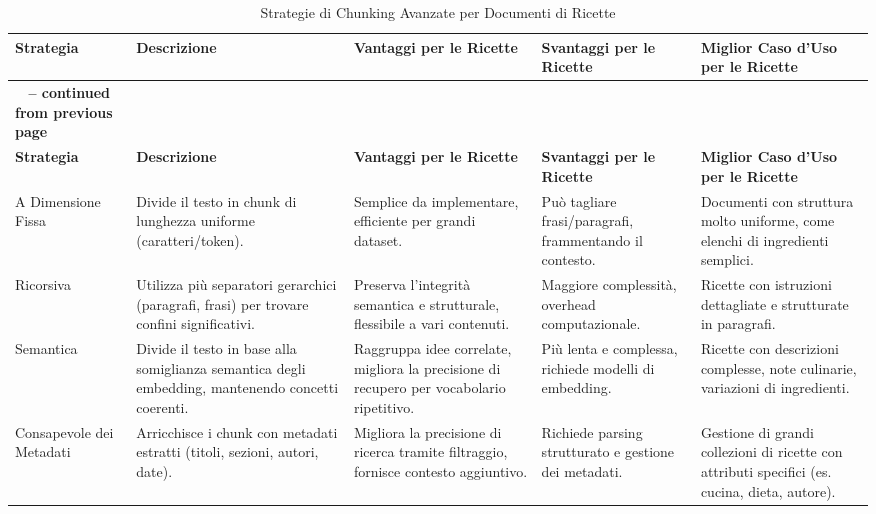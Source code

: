\documentclass[a4paper, 11pt]{article}
\begin{document}
\begin{longtable}{>{\raggedright\arraybackslash}p{2.5cm} >{\raggedright\arraybackslash}p{3.5cm} >{\raggedright\arraybackslash}p{3.5cm} >{\raggedright\arraybackslash}p{3cm} >{\raggedright\arraybackslash}p{3.5cm}}
\caption{Strategie di Chunking Avanzate per Documenti di Ricette}\\
\toprule
\textbf{Strategia} & \textbf{Descrizione} & \textbf{Vantaggi per le Ricette} & \textbf{Svantaggi per le Ricette} & \textbf{Miglior Caso d'Uso per le Ricette} \\
\midrule
\endfirsthead
\multicolumn{5}{c}%
{{\bfseries \tablename\ \thetable{} -- continued from previous page}} \\
\toprule
\textbf{Strategia} & \textbf{Descrizione} & \textbf{Vantaggi per le Ricette} & \textbf{Svantaggi per le Ricette} & \textbf{Miglior Caso d'Uso per le Ricette} \\
\midrule
\endhead
\bottomrule
\endfoot
A Dimensione Fissa \cite{chunking_strategies_ibm} & Divide il testo in chunk di lunghezza uniforme (caratteri/token). & Semplice da implementare, efficiente per grandi dataset. \cite{f22_chunking_strategies} & Può tagliare frasi/paragrafi, frammentando il contesto. \cite{semantic_chunking_ani} & Documenti con struttura molto uniforme, come elenchi di ingredienti semplici. \\
\addlinespace
Ricorsiva \cite{chunking_strategies_ibm} & Utilizza più separatori gerarchici (paragrafi, frasi) per trovare confini significativi. & Preserva l'integrità semantica e strutturale, flessibile a vari contenuti. \cite{f22_chunking_strategies} & Maggiore complessità, overhead computazionale. \cite{f22_chunking_strategies} & Ricette con istruzioni dettagliate e strutturate in paragrafi. \\
\addlinespace
Semantica \cite{semantic_chunking_multimodal} & Divide il testo in base alla somiglianza semantica degli embedding, mantenendo concetti coerenti. & Raggruppa idee correlate, migliora la precisione di recupero per vocabolario ripetitivo. \cite{semantic_chunking_multimodal} & Più lenta e complessa, richiede modelli di embedding. \cite{semantic_chunking_ani} & Ricette con descrizioni complesse, note culinarie, variazioni di ingredienti. \\
\addlinespace
Consapevole dei Metadati \cite{semantic_chunking_multimodal} & Arricchisce i chunk con metadati estratti (titoli, sezioni, autori, date). & Migliora la precisione di ricerca tramite filtraggio, fornisce contesto aggiuntivo. \cite{metadata_aware_chunking_asimsultan} & Richiede parsing strutturato e gestione dei metadati. \cite{metadata_aware_chunking_asimsultan} & Gestione di grandi collezioni di ricette con attributi specifici (es. cucina, dieta, autore). \\

\end{longtable}
\end{document}
